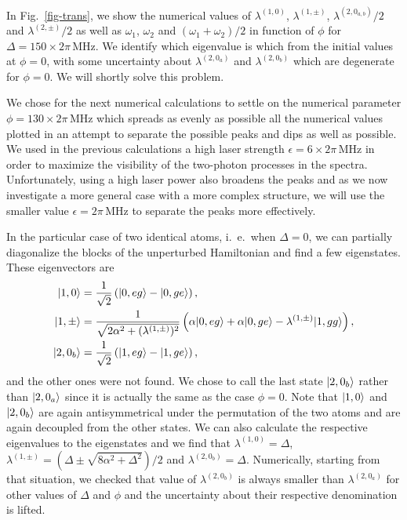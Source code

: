 In Fig.~\ref{fig-trans}, we show the numerical values of $\lambda^{(1,0)}$, $\lambda^{(1,\pm)}$, $\lambda^{(2,0_{a,b})}/2$ and $\lambda^{(2,\pm)}/2$ as well as $\omega_1$, $\omega_2$ and $(\omega_1+\omega_2)/2$ in function of $\phi$ for $\Delta=150\times 2\pi\,\mbox{MHz}$. We identify which eigenvalue is which from the initial values at $\phi=0$, with some uncertainty about $\lambda^{(2,0_{a})}$ and $\lambda^{(2,0_{b})}$ which are degenerate for $\phi=0$. We will shortly solve this problem.

We chose for the next numerical calculations to settle on the numerical parameter  $\phi=130 \times 2\pi\,\mbox{MHz}$ which spreads as evenly as possible all the numerical values plotted in an attempt to separate the possible peaks and dips as well as possible. We used in the previous calculations a high laser strength $\epsilon=6 \times 2\pi\,\mbox{MHz}$ in order to maximize the visibility of the two-photon processes in the spectra. Unfortunately, using a high laser power also broadens the peaks and as we now  investigate a more general case with a more complex structure, we will use the smaller value $\epsilon= 2\pi\,\mbox{MHz}$ to separate the peaks more effectively.

In the particular case  of two identical atoms, i.~e.~when $\Delta=0$, we can partially diagonalize the blocks of the unperturbed Hamiltonian and find a few eigenstates. These eigenvectors are
\begin{align}
    | 1,0 \rangle   & = \frac{1}{\sqrt 2} \left( | 0,eg \rangle  - | 0,ge \rangle \right),                                                                                \\
    | 1,\pm \rangle & = \frac{1}{\sqrt{2\alpha^2 + (\lambda^{(1,\pm)})^2 }} \left( \alpha | 0,eg \rangle + \alpha | 0,ge \rangle - \lambda^{(1,\pm)} | 1,gg \rangle \right) , \\
    | 2,0_b \rangle & = \frac{1}{\sqrt 2} \left( | 1,eg \rangle  - | 1,ge \rangle \right),
\end{align}
and the other ones were not found. We chose to call the last state $| 2,0_b \rangle$ rather than $| 2,0_a \rangle$ since it is actually the same as the case $\phi=0$. Note that $| 1,0 \rangle$ and $| 2,0_b \rangle$ are again antisymmetrical under the permutation of the two atoms and are again decoupled from the other states. We can also calculate the respective eigenvalues to the eigenstates and we find that $\lambda^{(1,0)} = \Delta$, $\lambda^{(1,\pm)} =( \Delta \pm \sqrt{8\alpha^2+\Delta^2})/2$ and $\lambda^{(2,0_b)}= \Delta$. Numerically, starting from that situation, we checked that value of $\lambda^{(2,0_b)}$ is always smaller than $\lambda^{(2,0_a)}$ for other values of $\Delta$ and $\phi$ and the uncertainty about their respective denomination is lifted.

